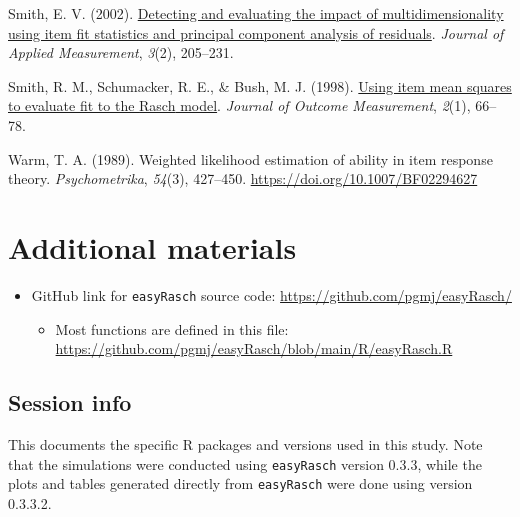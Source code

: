 \documentclass[
  letterpaper,
  DIV=11,
  numbers=noendperiod]{scrartcl}
\providecommand{\tightlist}{%
  \setlength{\itemsep}{0pt}\setlength{\parskip}{0pt}}\usepackage{longtable,booktabs,array}
\newlength{\cslhangindent}
\newenvironment{CSLReferences}[2] %
 {\begin{list}{}{%
  \setlength{\itemindent}{0pt}
  \setlength{\leftmargin}{0pt}
  \setlength{\parsep}{0pt}
  \ifodd #1
   \setlength{\leftmargin}{\cslhangindent}
   \setlength{\itemindent}{-1\cslhangindent}
  \fi
  \setlength{\itemsep}{#2\baselineskip}}}
 {\end{list}}
\begin{document}
\begin{CSLReferences}{1}{0}
Smith, E. V. (2002).
\href{https://www.ncbi.nlm.nih.gov/pubmed/12011501}{Detecting and
evaluating the impact of multidimensionality using item fit statistics
and principal component analysis of residuals}. \emph{Journal of Applied
Measurement}, \emph{3}(2), 205--231.

Smith, R. M., Schumacker, R. E., \& Bush, M. J. (1998).
\href{https://www.ncbi.nlm.nih.gov/pubmed/9661732}{Using item mean
squares to evaluate fit to the {Rasch} model}. \emph{Journal of Outcome
Measurement}, \emph{2}(1), 66--78.

Warm, T. A. (1989). Weighted likelihood estimation of ability in item
response theory. \emph{Psychometrika}, \emph{54}(3), 427--450.
\url{https://doi.org/10.1007/BF02294627}

\end{CSLReferences}

\section{Additional materials}\label{sec-addmat}

\begin{itemize}
\tightlist
\item
  GitHub link for \texttt{easyRasch} source code:
  \url{https://github.com/pgmj/easyRasch/}

  \begin{itemize}
  \tightlist
  \item
    Most functions are defined in this file:
    \url{https://github.com/pgmj/easyRasch/blob/main/R/easyRasch.R}
  \end{itemize}
\end{itemize}

\subsection{Session info}\label{session-info}

This documents the specific R packages and versions used in this study.
Note that the simulations were conducted using \texttt{easyRasch}
version 0.3.3, while the plots and tables generated directly from
\texttt{easyRasch} were done using version 0.3.3.2.
\end{document}
